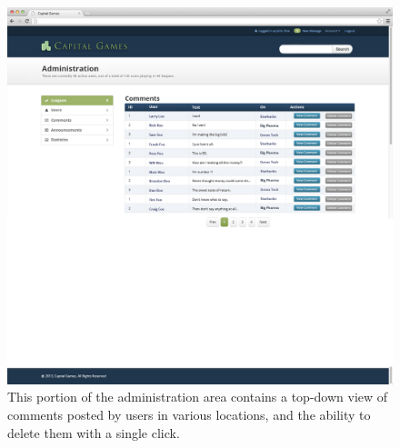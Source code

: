 \begin{figure}
\centering
\includegraphics[width=5.5in]{./mockups/JPEG/admincomments.jpg}
\caption{This portion of the administration area contains a top-down view of comments posted by users in various locations, and the ability to delete them with a single click.}
\end{figure}


